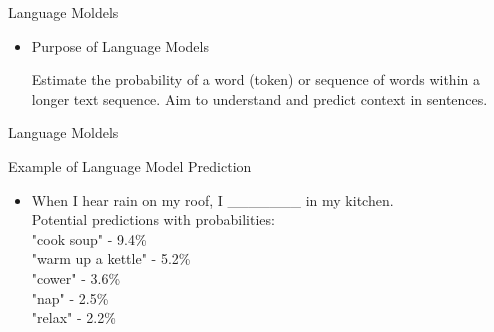 \documentclass[serif, aspectratio=169]{beamer}
\begin{document}
\begin{frame}{Language Moldels}
    \begin{itemize}
        \item  
            \large{Purpose of Language Models}
            \vspace{0.5cm}
            \begin{outline}
                \1 Estimate the probability of a word (token) or sequence of words within a longer text sequence.
                \vspace{0.2cm}
                \1 Aim to understand and predict context in sentences.
            \end{outline}
            \vspace{0.3cm}
        
    \end{itemize}
\end{frame}
    
\begin{frame}{Language Moldels}
    \begin{exampleblock}{Example of Language Model Prediction}
        \begin{itemize}
            \item 
                When I hear rain on my roof, I \_\_\_\_\_\_\_ in my kitchen.\\
                Potential predictions with probabilities:\\
                \hspace{1cm}"cook soup" - 9.4\%\\
                \hspace{1cm}"warm up a kettle" - 5.2\%\\
                \hspace{1cm}"cower" - 3.6\%\\
                \hspace{1cm}"nap" - 2.5\%\\
                \hspace{1cm}"relax" - 2.2\%\\
        \end{itemize}
    \end{exampleblock}
\end{frame}
\end{document}
